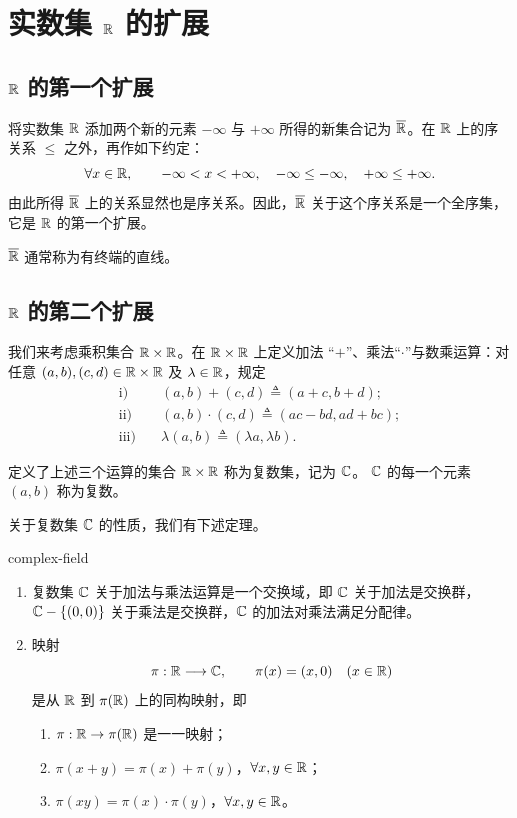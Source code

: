 \section{实数集 \(\mathbb{R}\) 的扩展}

\subsection{\(\mathbb{R}\) 的第一个扩展}

将实数集 \(\mathbb{R}\) 添加两个新的元素 \(-\infty\) 与 \(+\infty\) 所得的新集合记为
\(\overline{\mathbb{R}}\)。在 \(\mathbb{R}\) 上的序关系 \(\leq\) 之外，再作如下约定：
\[
\forall x\in\mathbb{R},
\qquad
-\infty<x<+\infty,\quad
-\infty\leq-\infty,\quad
+\infty\leq+\infty.
\]
由此所得 \(\overline{\mathbb{R}}\) 上的关系显然也是序关系。因此，\(\overline{\mathbb{R}}\)
关于这个序关系是一个全序集，它是 \(\mathbb{R}\) 的第一个扩展。

\(\overline{\mathbb{R}}\) 通常称为有终端的直线。

\subsection{\(\mathbb{R}\) 的第二个扩展}

我们来考虑乘积集合 \(\mathbb{R}\times\mathbb{R}\)。在 \(\mathbb{R}\times\mathbb{R}\) 上定义加法
“\(+\)”、乘法“\(\cdot\)”与数乘运算：对任意
\((a,b),(c,d)\in\mathbb{R}\times\mathbb{R}\) 及 \(\lambda\in\mathbb{R}\)，规定
\[
\begin{aligned}
\text{i)}\quad &(a,b)+(c,d)\mathrel{\triangleq}(a+c,b+d);\\
\text{ii)}\quad &(a,b)\cdot(c,d)\mathrel{\triangleq}(ac-bd,ad+bc);\\
\text{iii)}\quad &\lambda(a,b)\mathrel{\triangleq}(\lambda a,\lambda b).
\end{aligned}
\]

\begin{mydef*}{}
定义了上述三个运算的集合 \(\mathbb{R}\times\mathbb{R}\) 称为复数集，记为 \(\mathbb{C}\)。
\(\mathbb{C}\) 的每一个元素 \((a,b)\) 称为复数。
\end{mydef*}

关于复数集 \(\mathbb{C}\) 的性质，我们有下述定理。

\begin{mythm}{}{complex-field}
\begin{enumerate}[label=\arabic*)]
  \item 复数集 \(\mathbb{C}\) 关于加法与乘法运算是一个交换域，即 \(\mathbb{C}\)
  关于加法是交换群，\(\mathbb{C}-\{(0,0)\}\) 关于乘法是交换群，\(\mathbb{C}\)
  的加法对乘法满足分配律。
  \item 映射
  \[
  \pi:\mathbb{R}\longrightarrow\mathbb{C},
  \qquad
  \pi(x)=(x,0)\quad(x\in\mathbb{R})
  \]
  是从 \(\mathbb{R}\) 到 \(\pi(\mathbb{R})\) 上的同构映射，即
  \begin{enumerate}[label=\roman*)]
    \item \(\pi:\mathbb{R}\to\pi(\mathbb{R})\) 是一一映射；
    \item \(\pi(x+y)=\pi(x)+\pi(y)\)，\(\forall x,y\in\mathbb{R}\)；
    \item \(\pi(xy)=\pi(x)\cdot\pi(y)\)，\(\forall x,y\in\mathbb{R}\)。
  \end{enumerate}
\end{enumerate}
\end{mythm}

